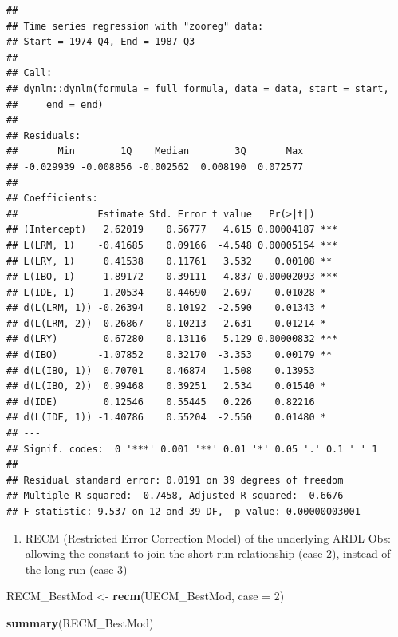 \documentclass[
]{book}
\newenvironment{Shaded}{\begin{snugshade}}{\end{snugshade}}
\newcommand{\AttributeTok}[1]{\textcolor[rgb]{0.13,0.29,0.53}{#1}}
\newcommand{\DecValTok}[1]{\textcolor[rgb]{0.00,0.00,0.81}{#1}}
\newcommand{\FunctionTok}[1]{\textcolor[rgb]{0.13,0.29,0.53}{\textbf{#1}}}
\newcommand{\NormalTok}[1]{#1}
\newcommand{\OtherTok}[1]{\textcolor[rgb]{0.56,0.35,0.01}{#1}}
\providecommand{\tightlist}{%
  \setlength{\itemsep}{0pt}\setlength{\parskip}{0pt}}
\begin{document}
\begin{verbatim}
## 
## Time series regression with "zooreg" data:
## Start = 1974 Q4, End = 1987 Q3
## 
## Call:
## dynlm::dynlm(formula = full_formula, data = data, start = start, 
##     end = end)
## 
## Residuals:
##       Min        1Q    Median        3Q       Max 
## -0.029939 -0.008856 -0.002562  0.008190  0.072577 
## 
## Coefficients:
##              Estimate Std. Error t value   Pr(>|t|)    
## (Intercept)   2.62019    0.56777   4.615 0.00004187 ***
## L(LRM, 1)    -0.41685    0.09166  -4.548 0.00005154 ***
## L(LRY, 1)     0.41538    0.11761   3.532    0.00108 ** 
## L(IBO, 1)    -1.89172    0.39111  -4.837 0.00002093 ***
## L(IDE, 1)     1.20534    0.44690   2.697    0.01028 *  
## d(L(LRM, 1)) -0.26394    0.10192  -2.590    0.01343 *  
## d(L(LRM, 2))  0.26867    0.10213   2.631    0.01214 *  
## d(LRY)        0.67280    0.13116   5.129 0.00000832 ***
## d(IBO)       -1.07852    0.32170  -3.353    0.00179 ** 
## d(L(IBO, 1))  0.70701    0.46874   1.508    0.13953    
## d(L(IBO, 2))  0.99468    0.39251   2.534    0.01540 *  
## d(IDE)        0.12546    0.55445   0.226    0.82216    
## d(L(IDE, 1)) -1.40786    0.55204  -2.550    0.01480 *  
## ---
## Signif. codes:  0 '***' 0.001 '**' 0.01 '*' 0.05 '.' 0.1 ' ' 1
## 
## Residual standard error: 0.0191 on 39 degrees of freedom
## Multiple R-squared:  0.7458, Adjusted R-squared:  0.6676 
## F-statistic: 9.537 on 12 and 39 DF,  p-value: 0.00000003001
\end{verbatim}

\begin{enumerate}
\def\labelenumi{\arabic{enumi}.}
\setcounter{enumi}{2}
\tightlist
\item
  RECM (Restricted Error Correction Model) of the underlying ARDL
  Obs: allowing the constant to join the short-run relationship (case 2), instead of the long-run (case 3)
\end{enumerate}

\begin{Shaded}
\begin{Highlighting}[]
\NormalTok{RECM\_BestMod }\OtherTok{\textless{}{-}} \FunctionTok{recm}\NormalTok{(UECM\_BestMod, }\AttributeTok{case =} \DecValTok{2}\NormalTok{)}

\FunctionTok{summary}\NormalTok{(RECM\_BestMod)}
\end{Highlighting}
\end{Shaded}
\end{document}

